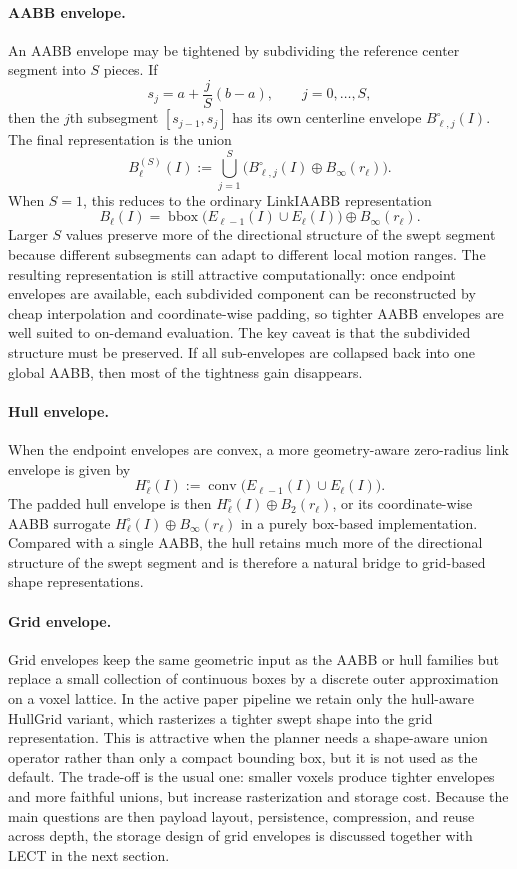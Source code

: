 \documentclass[journal]{IEEEtran}
\begin{document}
\paragraph{AABB envelope.}
An AABB envelope may be tightened by subdividing the reference center segment
into $S$ pieces. If
\[
s_j = a + \frac{j}{S}(b-a), \qquad j=0,\dots,S,
\]
then the $j$th subsegment $[s_{j-1},s_j]$ has its own centerline envelope
$B^{\circ}_{\ell,j}(I)$. The final representation is the union
\[
B^{(S)}_\ell(I) := \bigcup_{j=1}^{S}
\bigl(B^{\circ}_{\ell,j}(I) \oplus B_\infty(r_\ell)\bigr).
\]
When $S=1$, this reduces to the ordinary LinkIAABB representation
\[
B_\ell(I) = \operatorname{bbox}\bigl(E_{\ell-1}(I) \cup E_\ell(I)\bigr)
\oplus B_\infty(r_\ell).
\]
Larger $S$ values preserve more of the directional structure of the swept
segment because different subsegments can adapt to different local motion
ranges. The resulting representation is still attractive computationally:
once endpoint envelopes are available, each subdivided component can be
reconstructed by cheap interpolation and coordinate-wise padding, so tighter
AABB envelopes are well suited to on-demand evaluation. The key caveat is that
the subdivided structure must be preserved. If all sub-envelopes are collapsed
back into one global AABB, then most of the tightness gain disappears.


\paragraph{Hull envelope.}
When the endpoint envelopes are convex, a more geometry-aware zero-radius link
envelope is given by
\[
H_\ell^{\circ}(I) := \operatorname{conv}\bigl(E_{\ell-1}(I) \cup E_\ell(I)\bigr).
\]
The padded hull envelope is then $H_\ell^{\circ}(I) \oplus B_2(r_\ell)$, or its
coordinate-wise AABB surrogate
$H_\ell^{\circ}(I) \oplus B_\infty(r_\ell)$ in a purely box-based
implementation. Compared with a single AABB, the hull retains much more of the
directional structure of the swept segment and is therefore a natural bridge to
grid-based shape representations.

\paragraph{Grid envelope.}
Grid envelopes keep the same geometric input as the AABB or hull families but
replace a small collection of continuous boxes by a discrete outer
approximation on a voxel lattice. In the active paper pipeline we retain only
the hull-aware HullGrid variant, which rasterizes a tighter swept shape into
the grid representation. This is attractive when the planner needs a
shape-aware union operator rather than only a compact bounding box, but it is
not used as the default. The trade-off is the usual one: smaller
voxels produce tighter envelopes and more faithful unions, but increase
rasterization and storage cost. Because the main questions are then payload
layout, persistence, compression, and reuse across depth, the storage design of
grid envelopes is discussed together with LECT in the next section.
\end{document}
